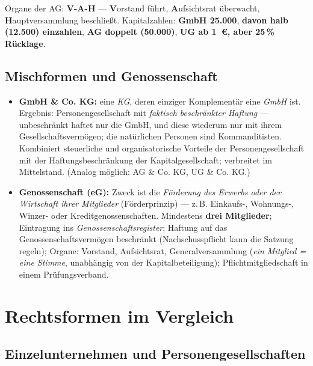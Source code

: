 \documentclass[11pt, a4paper]{article}
\begin{document}
\begin{eselsbruecke}
Organe der AG: \textbf{V-A-H} --- \textbf{V}orstand führt, \textbf{A}ufsichtsrat
überwacht, \textbf{H}auptversammlung beschließt. Kapitalzahlen: \textbf{GmbH 25.000},
\textbf{davon halb (12.500) einzahlen}, \textbf{AG doppelt (50.000)}, \textbf{UG ab 1~€,
aber 25\,\% Rücklage}.
\end{eselsbruecke}

\subsection{Mischformen und Genossenschaft}

\begin{itemize}
  \item \textbf{GmbH \& Co. KG:} eine \emph{KG}, deren einziger Komplementär eine
    \emph{GmbH} ist. Ergebnis: Personengesellschaft mit \emph{faktisch beschränkter
    Haftung} --- unbeschränkt haftet nur die GmbH, und diese wiederum nur mit ihrem
    Gesellschaftsvermögen; die natürlichen Personen sind Kommanditisten. Kombiniert
    steuerliche und organisatorische Vorteile der Personengesellschaft mit der
    Haftungsbeschränkung der Kapitalgesellschaft; verbreitet im Mittelstand.
    (Analog möglich: AG \& Co. KG, UG \& Co. KG.)
  \item \textbf{Genossenschaft (eG):} Zweck ist die \emph{Förderung des Erwerbs oder der
    Wirtschaft ihrer Mitglieder} (Förderprinzip) --- z.\,B. Einkaufs-, Wohnungs-,
    Winzer- oder Kreditgenossenschaften. Mindestens \textbf{drei Mitglieder}; Eintragung
    ins \emph{Genossenschaftsregister}; Haftung auf das Genossenschaftsvermögen
    beschränkt (Nachschusspflicht kann die Satzung regeln); Organe: Vorstand,
    Aufsichtsrat, Generalversammlung (\emph{ein Mitglied = eine Stimme}, unabhängig von
    der Kapitalbeteiligung); Pflichtmitgliedschaft in einem Prüfungsverband.
\end{itemize}

\section{Rechtsformen im Vergleich}

\subsection{Einzelunternehmen und Personengesellschaften}
\end{document}
